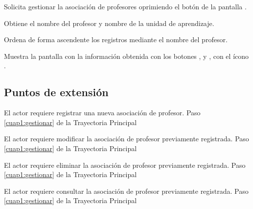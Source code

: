 \begin{UCtrayectoria}
	
	\UCpaso [\UCactor] Solicita gestionar la asociación de profesores oprimiendo el botón  de la pantalla .
	
	\UCpaso [\UCsist] Obtiene el nombre del profesor y nombre de la unidad de aprendizaje.
	
	\UCpaso [\UCsist] Ordena de forma ascendente los registros mediante el nombre del profesor.
	
	\UCpaso[\UCsist] Muestra la pantalla  con la información obtenida con los botones ,  y , con el ícono \btnRegistrar. \label{cuap1:gestionar}
\end{UCtrayectoria}

\subsection{Puntos de extensión}

\UCExtensionPoint 
{El actor requiere registrar una nueva asociación de profesor.}
{Paso \ref{cuap1:gestionar} de la Trayectoria Principal}
{}

\UCExtensionPoint 
{El actor requiere modificar la asociación de profesor previamente registrada.}
{Paso \ref{cuap1:gestionar} de la Trayectoria Principal}
{}

\UCExtensionPoint 
{El actor requiere eliminar la asociación de profesor previamente registrada.}
{Paso \ref{cuap1:gestionar} de la Trayectoria Principal}
{}

\UCExtensionPoint 
{El actor requiere consultar la asociación de profesor previamente registrada.}
{Paso \ref{cuap1:gestionar} de la Trayectoria Principal}
{}


